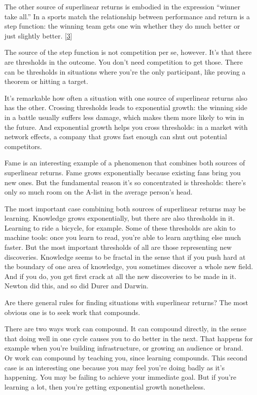 The other source of superlinear returns is embodied in the expression
``winner take all.'' In a sports match the relationship between
performance and return is a step function: the winning team gets one win
whether they do much better or just slightly better.
{[}\hyperref[f3n]{3}{]}

The source of the step function is not competition per se, however. It's
that there are thresholds in the outcome. You don't need competition to
get those. There can be thresholds in situations where you're the only
participant, like proving a theorem or hitting a target.

It's remarkable how often a situation with one source of superlinear
returns also has the other. Crossing thresholds leads to exponential
growth: the winning side in a battle usually suffers less damage, which
makes them more likely to win in the future. And exponential growth
helps you cross thresholds: in a market with network effects, a company
that grows fast enough can shut out potential competitors.

Fame is an interesting example of a phenomenon that combines both
sources of superlinear returns. Fame grows exponentially because
existing fans bring you new ones. But the fundamental reason it's so
concentrated is thresholds: there's only so much room on the A-list in
the average person's head.

The most important case combining both sources of superlinear returns
may be learning. Knowledge grows exponentially, but there are also
thresholds in it. Learning to ride a bicycle, for example. Some of these
thresholds are akin to machine tools: once you learn to read, you're
able to learn anything else much faster. But the most important
thresholds of all are those representing new discoveries. Knowledge
seems to be fractal in the sense that if you push hard at the boundary
of one area of knowledge, you sometimes discover a whole new field. And
if you do, you get first crack at all the new discoveries to be made in
it. Newton did this, and so did Durer and Darwin.

Are there general rules for finding situations with superlinear returns?
The most obvious one is to seek work that compounds.

There are two ways work can compound. It can compound directly, in the
sense that doing well in one cycle causes you to do better in the next.
That happens for example when you're building infrastructure, or growing
an audience or brand. Or work can compound by teaching you, since
learning compounds. This second case is an interesting one because you
may feel you're doing badly as it's happening. You may be failing to
achieve your immediate goal. But if you're learning a lot, then you're
getting exponential growth nonetheless.

